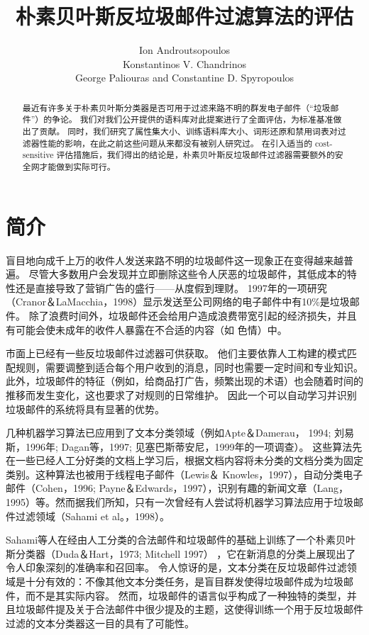 \documentclass[UTF8]{ctexart}
\title{朴素贝叶斯反垃圾邮件过滤算法的评估}
\author{Ion Androutsopoulos\\ Konstantinos V. Chandrinos\\George Paliouras
	and Constantine D. Spyropoulos}
\date{}
\begin{document}
\maketitle
\begin{abstract}
最近有许多关于朴素贝叶斯分类器是否可用于过滤来路不明的群发电子邮件（“垃圾邮件”）的争论。 我们对我们公开提供的语料库对此提案进行了全面评估，为标准基准做出了贡献。 同时，我们研究了属性集大小、训练语料库大小、词形还原和禁用词表对过滤器性能的影响，在此之前这些问题从来都没有被别人研究过。 在引入适当的 cost-sensitive 评估措施后，我们得出的结论是，朴素贝叶斯反垃圾邮件过滤器需要额外的安全网才能做到实际可行。	
\end{abstract}

\section{简介}
盲目地向成千上万的收件人发送来路不明的垃圾邮件这一现象正在变得越来越普遍。 尽管大多数用户会发现并立即删除这些令人厌恶的垃圾邮件，其低成本的特性还是直接导致了营销广告的盛行——从度假到理财。 1997年的一项研究（Cranor＆LaMacchia，1998）显示发送至公司网络的电子邮件中有10\%是垃圾邮件。 除了浪费时间外，垃圾邮件还会给用户造成浪费带宽引起的经济损失，并且有可能会使未成年的收件人暴露在不合适的内容（如 色情）中。 

市面上已经有一些反垃圾邮件过滤器可供获取。  他们主要依靠人工构建的模式匹配规则，需要调整到适合每个用户收到的消息，同时也需要一定时间和专业知识。 此外，垃圾邮件的特征（例如，给商品打广告，频繁出现的术语）也会随着时间的推移而发生变化，这也要求了对规则的日常维护。 因此一个可以自动学习并识别垃圾邮件的系统将具有显著的优势。

几种机器学习算法已应用到了文本分类领域（例如Apte＆Damerau， 1994; 刘易斯，1996年; Dagan等，1997; 见塞巴斯蒂安尼，1999年的一项调查）。 这些算法先在一些已经人工分好类的文档上学习后，根据文档内容将未分类的文档分类为固定类别。这种算法也被用于线程电子邮件（Lewis＆ Knowles，1997），自动分类电子邮件（Cohen，1996; Payne＆Edwards，1997），识别有趣的新闻文章（Lang，1995）等。然而据我们所知，只有一次曾经有人尝试将机器学习算法应用于垃圾邮件过滤领域（Sahami et al。，1998）。 

Sahami等人在经由人工分类的合法邮件和垃圾邮件的基础上训练了一个朴素贝叶斯分类器（Duda＆Hart，1973; Mitchell 1997） ，它在新消息的分类上展现出了令人印象深刻的准确率和召回率。 令人惊讶的是，文本分类在反垃圾邮件过滤领域是十分有效的：不像其他文本分类任务，是盲目群发使得垃圾邮件成为垃圾邮件，而不是其实际内容。 然而，垃圾邮件的语言似乎构成了一种独特的类型，并且垃圾邮件提及关于合法邮件中很少提及的主题，这使得训练一个用于反垃圾邮件过滤的文本分类器这一目的具有了可能性。
\end{document}
